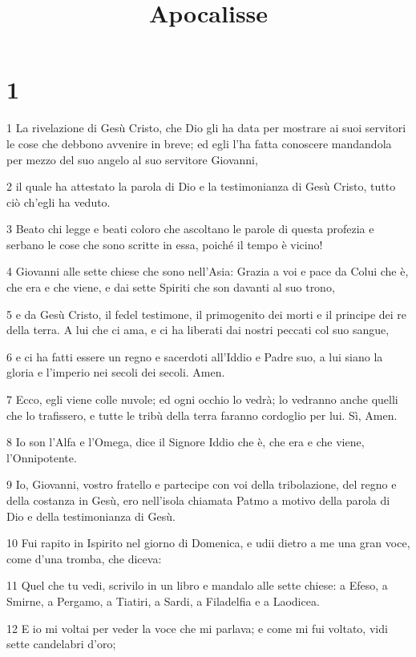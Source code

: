 

\title{Apocalisse}


\chapter{1}

\par 1 La rivelazione di Gesù Cristo, che Dio gli ha data per mostrare ai suoi servitori le cose che debbono avvenire in breve; ed egli l'ha fatta conoscere mandandola per mezzo del suo angelo al suo servitore Giovanni,
\par 2 il quale ha attestato la parola di Dio e la testimonianza di Gesù Cristo, tutto ciò ch'egli ha veduto.
\par 3 Beato chi legge e beati coloro che ascoltano le parole di questa profezia e serbano le cose che sono scritte in essa, poiché il tempo è vicino!
\par 4 Giovanni alle sette chiese che sono nell'Asia: Grazia a voi e pace da Colui che è, che era e che viene, e dai sette Spiriti che son davanti al suo trono,
\par 5 e da Gesù Cristo, il fedel testimone, il primogenito dei morti e il principe dei re della terra. A lui che ci ama, e ci ha liberati dai nostri peccati col suo sangue,
\par 6 e ci ha fatti essere un regno e sacerdoti all'Iddio e Padre suo, a lui siano la gloria e l'imperio nei secoli dei secoli. Amen.
\par 7 Ecco, egli viene colle nuvole; ed ogni occhio lo vedrà; lo vedranno anche quelli che lo trafissero, e tutte le tribù della terra faranno cordoglio per lui. Sì, Amen.
\par 8 Io son l'Alfa e l'Omega, dice il Signore Iddio che è, che era e che viene, l'Onnipotente.
\par 9 Io, Giovanni, vostro fratello e partecipe con voi della tribolazione, del regno e della costanza in Gesù, ero nell'isola chiamata Patmo a motivo della parola di Dio e della testimonianza di Gesù.
\par 10 Fui rapito in Ispirito nel giorno di Domenica, e udii dietro a me una gran voce, come d'una tromba, che diceva:
\par 11 Quel che tu vedi, scrivilo in un libro e mandalo alle sette chiese: a Efeso, a Smirne, a Pergamo, a Tiatiri, a Sardi, a Filadelfia e a Laodicea.
\par 12 E io mi voltai per veder la voce che mi parlava; e come mi fui voltato, vidi sette candelabri d'oro;
